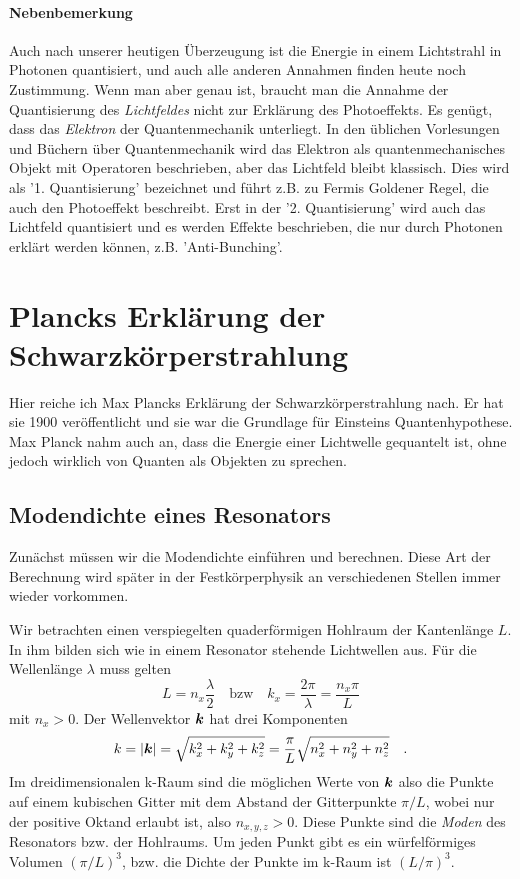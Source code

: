  \paragraph*{Nebenbemerkung} Auch nach unserer heutigen Überzeugung ist die Energie in einem Lichtstrahl in Photonen quantisiert, und auch alle anderen Annahmen finden heute noch Zustimmung. Wenn man aber genau ist, braucht man die Annahme der Quantisierung des \emph{Lichtfeldes} nicht zur Erklärung des Photoeffekts. Es genügt, dass das \emph{Elektron} der Quantenmechanik unterliegt. In den üblichen Vorlesungen und Büchern über Quantenmechanik wird das Elektron als quantenmechanisches Objekt mit Operatoren beschrieben, aber das Lichtfeld bleibt klassisch. Dies wird als '1. Quantisierung' bezeichnet und führt z.B. zu Fermis Goldener Regel, die auch den Photoeffekt beschreibt. Erst in der '2. Quantisierung' wird auch das Lichtfeld quantisiert und es werden Effekte beschrieben, die nur durch Photonen erklärt werden können, z.B. 'Anti-Bunching'.


 \section{Plancks Erklärung der Schwarzkörperstrahlung}

Hier reiche ich Max Plancks Erklärung der Schwarzkörperstrahlung nach. Er hat sie 1900 veröffentlicht und sie war die Grundlage für Einsteins Quantenhypothese. Max Planck nahm auch an, dass die Energie einer Lichtwelle gequantelt ist, ohne jedoch wirklich von Quanten als Objekten zu sprechen.

\subsection{Modendichte eines Resonators}

Zunächst müssen wir die Modendichte einführen und berechnen. Diese Art der Berechnung wird später in der Festkörperphysik an verschiedenen Stellen immer wieder vorkommen.

Wir betrachten einen verspiegelten quaderförmigen Hohlraum der Kantenlänge $L$. In ihm bilden sich wie in einem Resonator stehende Lichtwellen aus. Für die Wellenlänge $\lambda$ muss gelten
\begin{equation}
     L = n_x \frac{\lambda}{2} \quad \text{bzw} \quad k_x = \frac{2 \pi}{\lambda} = \frac{n_x \pi }{L}
\end{equation}
mit $n_x > 0$. Der Wellenvektor $\boldsymbol{k}$ hat drei Komponenten
\begin{equation}
    k = | \boldsymbol{k} | = \sqrt{k_x^2 + k_y^2 + k_z^2 } = \frac{\pi}{L} \sqrt{n_x^2 + n_y^2 + n_z^2} \quad .
\end{equation}
Im dreidimensionalen k-Raum sind die möglichen Werte von $\boldsymbol{k}$ also die Punkte auf einem kubischen Gitter mit dem Abstand der Gitterpunkte $\pi / L$, wobei nur der positive Oktand erlaubt ist, also $n_{x,y,z} > 0$. Diese Punkte sind die \emph{Moden} des Resonators bzw. der Hohlraums. Um jeden Punkt gibt es ein würfelförmiges Volumen $(\pi/L)^3$, bzw. die Dichte der Punkte im k-Raum ist $(L/\pi)^3$.

